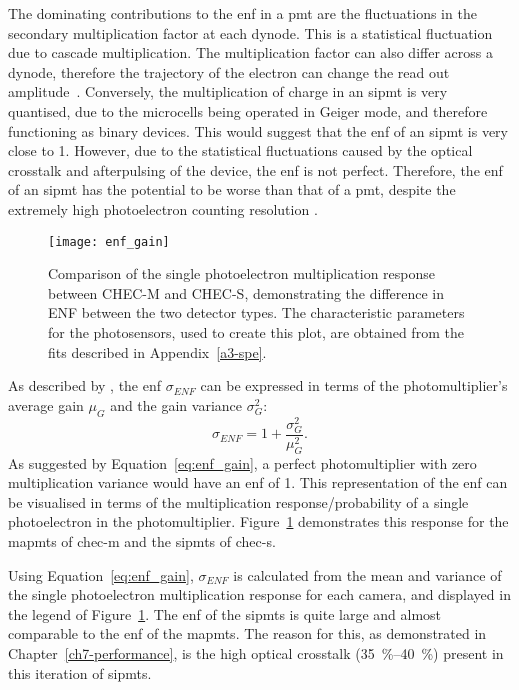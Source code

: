 The dominating contributions to the \gls{enf} in a \gls{pmt} are the fluctuations in the secondary multiplication factor at each dynode. This is a statistical fluctuation due to cascade multiplication. The multiplication factor can also differ across a dynode, therefore the trajectory of the electron can change the read out amplitude~\cite{HAMAMATSU2007}. Conversely, the multiplication of charge in an \gls{sipmt} is very quantised, due to the microcells being operated in Geiger mode, and therefore functioning as binary devices. This would suggest that the \gls{enf} of an \gls{sipmt} is very close to 1. However, due to the statistical fluctuations caused by the optical crosstalk and afterpulsing of the device, the \gls{enf} is not perfect. Therefore, the \gls{enf} of an \gls{sipmt} has the potential to be worse than that of a \gls{pmt}, despite the extremely high photoelectron counting resolution \cite{Vinogradov2012}.

\begin{figure}
	\centering
    \texttt{[image: enf\_gain]} 
	\caption[Comparison of the single photoelectron multiplication response between CHEC-M and CHEC-S.]{Comparison of the single photoelectron multiplication response between CHEC-M and CHEC-S, demonstrating the difference in ENF between the two detector types. The characteristic parameters for the photosensors, used to create this plot, are obtained from the fits described in Appendix~\ref{a3-spe}.}
	\label{fig:enf_gain}
\end{figure}

As described by \textcite{Teich1986}, the \gls{enf} $\sigma_{ENF}$ can be expressed in terms of the photomultiplier's average gain $\mu_G$ and the gain variance $\sigma_G^2$:
\begin{equation} \label{eq:enf_gain}
\sigma_{ENF} = 1 + \frac{\sigma_G^2}{\mu_G^2}.
\end{equation}
As suggested by Equation~\ref{eq:enf_gain}, a perfect photomultiplier with zero multiplication variance would have an \gls{enf} of 1. This representation of the \gls{enf} can be visualised in terms of the multiplication response/probability of a single photoelectron in the photomultiplier. Figure~\ref{fig:enf_gain} demonstrates this response for the \glspl{mapmt} of \gls{chec-m} and the \glspl{sipmt} of \gls{chec-s}. 

Using Equation~\ref{eq:enf_gain}, $\sigma_{ENF}$ is calculated from the mean and variance of the single photoelectron multiplication response for each camera, and displayed in the legend of Figure~\ref{fig:enf_gain}. The \gls{enf} of the \glspl{sipmt} is quite large and almost comparable to the \gls{enf} of the \glspl{mapmt}. The reason for this, as demonstrated in Chapter~\ref{ch7-performance}, is the high optical crosstalk (\SIrange{35}{40}{\percent}) present in this iteration of \glspl{sipmt}.

